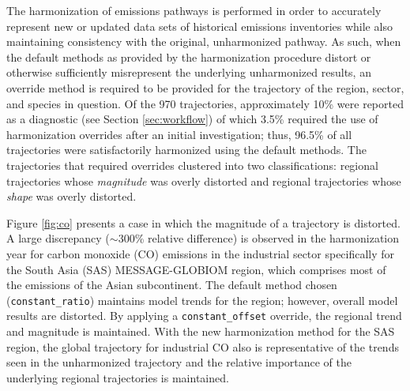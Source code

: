 \documentclass[review]{elsarticle}
\newcommand{\code}[1]{\lstinline[basicstyle=\ttfamily\color{black}]|#1|}
\begin{document}
The harmonization of emissions pathways is performed in order to accurately
represent new or updated data sets of historical emissions inventories while also
maintaining consistency with the original, unharmonized pathway. As such, when
the default methods as provided by the harmonization procedure distort or
otherwise sufficiently misrepresent the underlying unharmonized results, an
override method is required to be provided for the trajectory of the region,
sector, and species in question. Of the 970 trajectories, approximately 10\%
were reported as a diagnostic (see Section \ref{sec:workflow}) of which 3.5\%
required the use of harmonization overrides after an initial investigation;
thus, 96.5\% of all trajectories were satisfactorily harmonized using the
default methods. The trajectories that required overrides clustered into two
classifications: regional trajectories whose \textit{magnitude} was overly
distorted and regional trajectories whose \textit{shape} was overly distorted.

Figure \ref{fig:co} presents a case in which the magnitude of a trajectory is
distorted. A large discrepancy ($\sim$300\% relative difference) is observed in
the harmonization year for carbon monoxide (CO) emissions in the industrial
sector specifically for the South Asia (SAS) MESSAGE-GLOBIOM region, which
comprises most of the emissions of the Asian subcontinent. The default method
chosen (\code{constant_ratio}) maintains model trends for the region; however,
overall model results are distorted. By applying a \code{constant_offset}
override, the regional trend and magnitude is maintained. With the new
harmonization method for the SAS region, the global trajectory for industrial CO
also is representative of the trends seen in the unharmonized trajectory and the
relative importance of the underlying regional trajectories is maintained.
\end{document}
